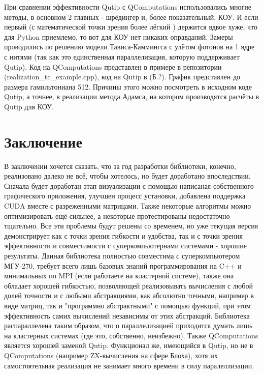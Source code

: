 \documentclass[aps,twocolumn,pra,showpacs,amsmath,amssymb,showkeys,10pt]{revtex4-2}
\begin{document}
\begin{itemize}
{    При сравнении эффективности Qutip с QComputations использовались многие методы, в основном 2 главных - шрёдингер и, более показательный, КОУ. И если первый (с математической точки зрения более лёгкий 
    ) держится вдвое хуже, что для Python приемлемо, то вот для КОУ нет никаких оправданий. Замеры проводились по решению модели Тависа-Каммингса с улётом фотонов на 1 ядре с нитями (так как 
    это единственная параллелизация, которую поддерживает Qutip). Код на QComputations представлен в 
    примере в репозитории (realization\_tc\_example.cpp), код на Qutip в (Б.?). График представлен до размера гамильтониана 512. Причины этого можно посмотреть в исходном коде Qutip, а точнее, 
    в реализации метода Адамса, на котором производятся расчёты в Qutip для КОУ.}

    \end{itemize}

    \section{Заключение}

    В заключении хочется сказать, что за год разработки библиотеки, конечно, реализовано далеко не всё, чтобы хотелось, но будет доработано впоследствии. Сначала будет доработан этап визуализации с 
    помощью написаная собственного графического приложения, улучшен процесс установки, добавлена поддержка CUDA вместе с разреженными матрицами. Также некоторые алгоритмы можно оптимизировать ещё сильнее, 
    а некоторые протестированы недостаточно тщательно. Все эти проблемы будут решены со временем, но уже текущая версия демонстрирует как с точки зрения гибкости и удобства, так и с точки зрения
    эффективности и совместимости с суперкомпьютернами системами - хорошие результаты.
      Данная библиотека полностью совместима с суперкомпьютером МГУ-270, требует всего лишь базовых знаний программирования на C++ и 
    минимальных по MPI (если работаете на кластерной системе), также она обладает хорошей гибкостью, позволяющей реализовывать вычисления с любой долей точности и с любыми абстракциями, 
    как абсолютно точными, например в виде матриц, так и "программно абстрактными" с помощью функций, при этом эффективность самих вычислений независимы от этих абстракций. Библиотека распараллелена 
    таким образом, что о параллелизацией приходится думать лишь на кластерных системах (где это, собственно, неизбежно).
      Также QComputations является хорошей заменой Qutip. Функционал же, имеющийся в Qutip, но не в QComputations (например ZX-вычисления на сфере Блоха), хотя их самостоятельная реализация не 
      занимает много времени в силу паралеллизации.
      
\end{document}
